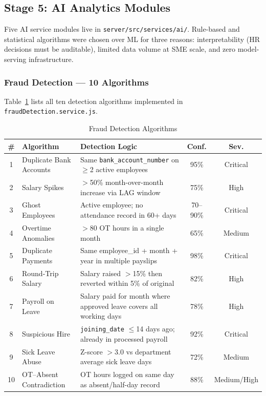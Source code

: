 \documentclass[12pt,a4paper]{report}
\begin{document}
\subsection{Stage 5: AI Analytics Modules}

Five AI service modules live in \texttt{server/src/services/ai/}. Rule-based and statistical algorithms were chosen over ML for three reasons: interpretability (HR decisions must be auditable), limited data volume at SME scale, and zero model-serving infrastructure.

\subsubsection{Fraud Detection --- 10 Algorithms}

Table~\ref{tab:fraud_algorithms} lists all ten detection algorithms implemented in \texttt{fraudDetection.service.js}.

\begin{table}[H]
\centering
\caption{Fraud Detection Algorithms}
\label{tab:fraud_algorithms}
\begin{tabular}{|c|p{4cm}|p{5cm}|c|c|}
\hline
\textbf{\#} & \textbf{Algorithm} & \textbf{Detection Logic} & \textbf{Conf.} & \textbf{Sev.} \\
\hline
1 & Duplicate Bank Accounts     & Same \texttt{bank\_account\_number} on $\geq$2 active employees & 95\% & Critical \\
\hline
2 & Salary Spikes               & $>$50\% month-over-month increase via LAG window & 75\% & High \\
\hline
3 & Ghost Employees             & Active employee; no attendance record in 60+ days & 70--90\% & Critical \\
\hline
4 & Overtime Anomalies          & $>$80 OT hours in a single month & 65\% & Medium \\
\hline
5 & Duplicate Payments          & Same employee\_id + month + year in multiple payslips & 98\% & Critical \\
\hline
6 & Round-Trip Salary           & Salary raised $>$15\% then reverted within 5\% of original & 82\% & High \\
\hline
7 & Payroll on Leave            & Salary paid for month where approved leave covers all working days & 78\% & High \\
\hline
8 & Suspicious Hire             & \texttt{joining\_date} $\leq$14 days ago; already in processed payroll & 92\% & Critical \\
\hline
9 & Sick Leave Abuse            & Z-score $>$3.0 vs department average sick leave days & 72\% & Medium \\
\hline
10 & OT--Absent Contradiction   & OT hours logged on same day as absent/half-day record & 88\% & Medium/High \\
\hline
\end{tabular}
\end{table}
\end{document}
